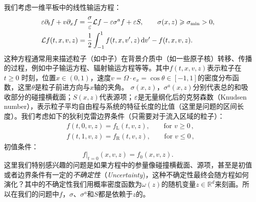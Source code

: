 我们考虑一维平板中的线性输运方程：
\begin{align}\label{eq-onegroup}
  & \varepsilon \partial_t f + v \partial_x f = \frac{\sigma}{\varepsilon}{\cal L} f - \varepsilon \sigma^a f + \varepsilon S, \qquad \sigma(x, z) \geqslant \sigma_{\text{min}} > 0,
  \\
  \label{L}
  & {\cal L} f(t,x,v,z) = \frac{1}{2} \int_{-1}^1 f(t, x,v',z) \mathop{}\!\mathrm{d} v' - f(t,x,v,z).
\end{align}
这种方程通常用来描述粒子（如中子）在背景介质中（如一些原子核）转移、传播的过程，例如中子输运方程、辐射输运方程等等。其中$f(t,x,v,z)$表示粒子在$t\ge 0$ 时刻，位置$x \in (0,1)$，速度$v=\Omega\cdot e_x = \cos \theta \in [-1, 1]$的密度分布函数，这里$\theta$是粒子前进方向与$x$轴的夹角。
$\sigma(x,z)$，$\sigma^a(x,z)$分别代表总的和吸收部分的碰撞横截面；$S(x,z)$代表源项；$\varepsilon$是无量纲化后的克努森数（Knudsen number），表示粒子平均自由程与系统的特征长度的比值（这里是问题的区间长度）。我们考虑如下的狄利克雷边界条件（只需要对于流入区域的粒子）：
\begin{equation}\label{BC}
  \begin{split}
  & f(t,0,v,z) = f_{\mathrm{L}}(t,v,z),  \qquad \mbox{for }v\ge 0\,,
  \\
  & f(t,1,v,z) = f_{\mathrm{R}}(t,v,z),  \qquad\mbox{for } v\le 0\,,
  \end{split}
\end{equation}
初值条件：
\begin{equation}\label{IC}
  f |_{t=0}(x,v,z) = f_0(x,v,z).
\end{equation}
这里我们特别感兴趣的问题是如果方程中的参量像碰撞横截面、源项，甚至是初值或者边界条件有一定的{\it 不确定性}（{\it Uncertainty})，这种不确定性最终会随方程如何演化？其中的不确定性我们用概率密度函数为$\omega(z)$的随机变量$z\in \mathbb{R}^d$来刻画。所以在我们的问题中$f$，$\sigma$、$\sigma^a$和$S$都是依赖于$z$的。


